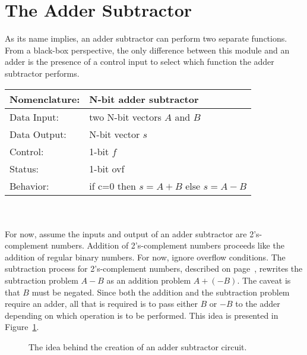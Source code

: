 \section{The Adder Subtractor}
As its name implies, an adder subtractor can perform two separate
functions.  From a black-box perspective, the only difference between
this module and an adder is the presence of a control input to select
which function the adder subtractor performs.
 

\begin{tabular}{|l|p{3.5in}|} \hline
Nomenclature:  & N-bit adder subtractor                 \\ \hline
Data Input:    & two N-bit vectors $A$ and $B$           \\ \hline  
Data Output:   & N-bit vector  $s$               \\ \hline
Control:       & 1-bit $f$                     \\ \hline
Status:        & 1-bit ovf 				\\ \hline
Behavior:      & if c=0 then $s = A+B$ else $s=A-B$     \\ \hline
\end{tabular}
\\ \\
For now, assume the inputs and output of an adder subtractor are
2's-complement numbers.  Addition of 2's-complement numbers proceeds 
like the addition of regular binary numbers.  For now, 
ignore overflow conditions.  The subtraction process
for 2's-complement numbers, described on page~\pageref{page:2sub}, rewrites
the subtraction problem $A-B$ as an addition problem $A+(-B)$.  The caveat
is that $B$ must be negated.  Since both the addition and the subtraction 
problem
require an adder, all that is required is to pass either $B$ or $-B$ to the
adder depending on which operation is to be performed.  This idea is
presented in Figure~\ref{fig:comboBBAddSub}.

\begin{figure}[ht]
\caption{The idea behind the creation of an adder subtractor circuit.}
\label{fig:comboBBAddSub}
\end{figure}

